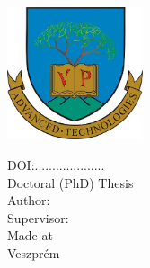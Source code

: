 \thispagestyle{empty}%
\begin{center}
    \myuni \\
    \myfaculty \\
    \myschool \\[0.6cm]
    \includegraphics[width=4cm]{img/MIK_cimer.jpg}\\[1.2cm]
    \begin{spacing}{2} \fontsize{25}{15}\textbf{ \textsc{\mytitle} }\end{spacing} %
    DOI:.................... \\[1.5cm]
    Doctoral (PhD) Thesis \\
    Author: \myauthor \\[1cm]
    Supervisor: \mysupervisor \\[1.5cm]
    Made at \myuni \myschool  \\[1.5cm]
    Veszpr\'em \\
    \mydate
\end{center}

\newpage 